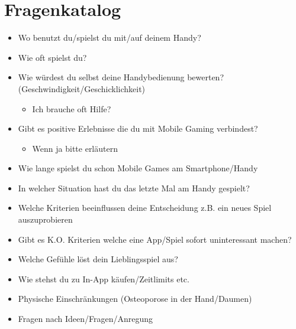 \documentclass[12pt, a4paper]{article}
\begin{document}
\section{Fragenkatalog}
\begin{itemize}
    \item Wo benutzt du/spielst du mit/auf deinem Handy?
    \item Wie oft spielst du?
    \item Wie würdest du selbst deine Handybedienung bewerten? (Geschwindigkeit/Geschicklichkeit)
    \begin{itemize}
        \item Ich brauche oft Hilfe?
    \end{itemize}
    \item Gibt es positive Erlebnisse die du mit Mobile Gaming verbindest?
    \begin{itemize}
        \item Wenn ja bitte erläutern
    \end{itemize}
    \item Wie lange spielst du schon Mobile Games am Smartphone/Handy
    \item In welcher Situation hast du das letzte Mal am Handy gespielt?
    \item Welche Kriterien beeinflussen deine Entscheidung z.B. ein neues Spiel auszuprobieren
    \item Gibt es K.O. Kriterien welche eine App/Spiel sofort uninteressant machen?
    \item Welche Gefühle löst dein Lieblingsspiel aus?
    \item Wie stehst du zu In-App käufen/Zeitlimits etc.
    \item Physische Einschränkungen (Osteoporose in der Hand/Daumen)
    \item Fragen nach Ideen/Fragen/Anregung
\end{itemize}

\newpage
\end{document}

